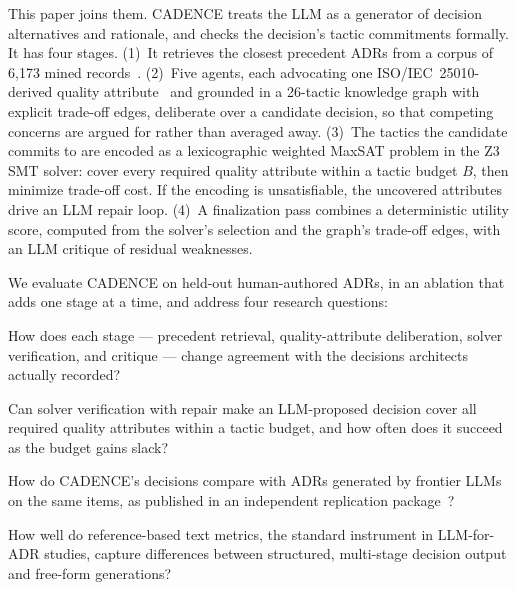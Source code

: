 \documentclass[preprint,12pt,authoryear]{elsarticle}
\renewcommand{\_}{\textunderscore\allowbreak{}}
\begin{document}
This paper joins them. CADENCE treats the LLM as a generator of decision alternatives and rationale, and checks the decision's tactic commitments formally. It has four stages. (1)~It retrieves the closest precedent ADRs from a corpus of 6{,}173 mined records~\citep{buchgeher2023adr}. (2)~Five agents, each advocating one ISO/IEC~25010-derived quality attribute~\citep{iso25010} and grounded in a 26-tactic knowledge graph with explicit trade-off edges, deliberate over a candidate decision, so that competing concerns are argued for rather than averaged away. (3)~The tactics the candidate commits to are encoded as a lexicographic weighted MaxSAT problem in the Z3 SMT solver: cover every required quality attribute within a tactic budget $B$, then minimize trade-off cost. If the encoding is unsatisfiable, the uncovered attributes drive an LLM repair loop. (4)~A finalization pass combines a deterministic utility score, computed from the solver's selection and the graph's trade-off edges, with an LLM critique of residual weaknesses.

We evaluate CADENCE on held-out human-authored ADRs, in an ablation that adds one stage at a time, and address four research questions:
\begin{description}[leftmargin=1.2em,style=nextline]
\item[RQ1 (stage contribution)] How does each stage --- precedent retrieval, quality-attribute deliberation, solver verification, and critique --- change agreement with the decisions architects actually recorded?
\item[RQ2 (feasibility)] Can solver verification with repair make an LLM-proposed decision cover all required quality attributes within a tactic budget, and how often does it succeed as the budget gains slack?
\item[RQ3 (external reference)] How do CADENCE's decisions compare with ADRs generated by frontier LLMs on the same items, as published in an independent replication package~\citep{contextmatters-zenodo}?
\item[RQ4 (measurement)] How well do reference-based text metrics, the standard instrument in LLM-for-ADR studies, capture differences between structured, multi-stage decision output and free-form generations?
\end{description}
\end{document}

